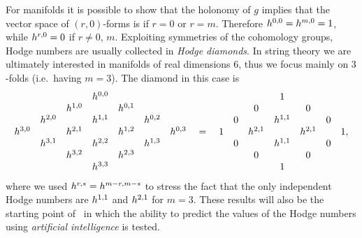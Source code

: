 For \cy manifolds it is possible to show that the  holonomy of $g$ implies that the vector space of $(r, 0)$-forms is \C if $r = 0$ or $r = m$.
Therefore $h^{0,0} = h^{m,0} = 1$, while $h^{r,0} = 0$ if $r \neq 0,\, m$.
Exploiting symmetries of the cohomology groups, Hodge numbers are usually collected in \emph{Hodge diamonds}.
In string theory we are ultimately interested in \cy manifolds of real dimensions $6$, thus we focus mainly on \cy $3$-folds (i.e.\ having $m = 3$).
The diamond in this case is
\begin{equation}
  \mqty{%
            &         &         & \hodge{0}{0} &         &         & 
    \\
            &         & \hodge{1}{0} &         & \hodge{0}{1} &         & 
    \\
            & \hodge{2}{0} &         & \hodge{1}{1} &         & \hodge{0}{2} & 
    \\
    \hodge{3}{0} &         & \hodge{2}{1} &         & \hodge{1}{2} &         & \hodge{0}{3}
    \\
            & \hodge{3}{1} &         & \hodge{2}{2} &         & \hodge{1}{3} & 
    \\
            &         & \hodge{3}{2} &         & \hodge{2}{3} &         & 
    \\
            &         &         & \hodge{3}{3} &         &         & 
  }
  \quad
  =
  \quad
  \mqty{%
            &         &         &    1    &         &         & 
    \\
            &         &    0    &         &    0    &         & 
    \\
            &    0    &         & \hodge{1}{1} &         &    0    & 
    \\
        1   &         & \hodge{2}{1} &         & \hodge{2}{1} &         &    1
    \\
            &    0    &         & \hodge{1}{1} &         &    0    & 
    \\
            &         &    0    &         &    0    &         & 
    \\
            &         &         &    1    &         &         & 
  },
\end{equation}
where we used $h^{r,s} = h^{m-r, m-s}$ to stress the fact that the only independent Hodge numbers are $h^{1,1}$ and $h^{2,1}$ for $m = 3$.
These results will also be the starting point of~ in which the ability to predict the values of the Hodge numbers using \emph{artificial intelligence} is tested.


